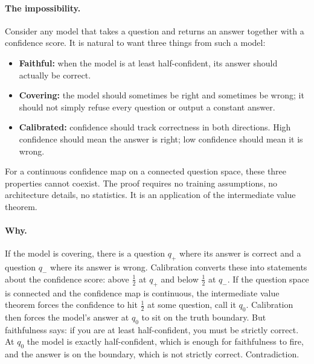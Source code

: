 \documentclass[10pt]{article}
\begin{document}
\paragraph{The impossibility.}
Consider any model that takes a question and returns an answer together
with a confidence score. It is natural to want three things from such a
model:

\begin{itemize}[nosep,leftmargin=1.5em]
\item \textbf{Faithful:} when the model is at least half-confident, its
  answer should actually be correct.
\item \textbf{Covering:} the model should sometimes be right and sometimes
  be wrong; it should not simply refuse every question or output a
  constant answer.
\item \textbf{Calibrated:} confidence should track correctness in both
  directions. High confidence should mean the answer is right; low
  confidence should mean it is wrong.
\end{itemize}

For a continuous confidence map on a connected question space, these three
properties cannot coexist. The proof requires no training assumptions, no
architecture details, no statistics. It is an application of the intermediate
value theorem.

\paragraph{Why.}
If the model is covering, there is a question $q_+$ where its answer is
correct and a question $q_-$ where its answer is wrong. Calibration converts
these into statements about the confidence score: above $\tfrac{1}{2}$ at
$q_+$ and below $\tfrac{1}{2}$ at $q_-$.
If the question space is connected and the confidence map is continuous,
the intermediate value theorem forces the confidence to hit $\tfrac{1}{2}$
at some question, call it $q_0$. Calibration then forces the model's answer
at $q_0$ to sit on the truth boundary. But
faithfulness says: if you are at least half-confident, you must be
strictly correct. At $q_0$ the model is exactly half-confident, which is
enough for faithfulness to fire, and the answer is on the boundary, which
is not strictly correct. Contradiction.
\end{document}

